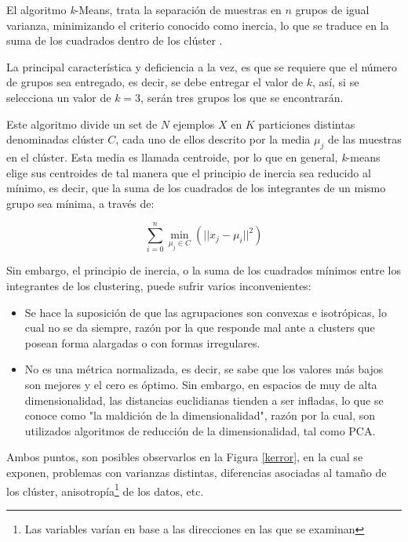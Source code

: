 El algoritmo \textit{k}-Means, trata la separación de muestras en $ n $ grupos de igual varianza, minimizando el criterio conocido como inercia, lo que se traduce en la suma de los cuadrados dentro de los clúster \cite{arthur2007k}.

La principal característica y deficiencia a la vez, es que se requiere que el número de grupos sea entregado, es decir, se debe entregar el valor de $k$, así, si se selecciona un valor de $k = 3$, serán tres grupos los que se encontrarán. 

Este algoritmo divide un set de $N$ ejemplos $X$ en $K$ particiones distintas denominadas clúster $C$, cada uno de ellos descrito por la media $\mu_{j}$ de las muestras en el clúster. Esta media es llamada centroide, por lo que en general, \textit{k}-means  elige sus centroides de tal manera que el principio de inercia sea reducido al mínimo, es decir, que la suma de los cuadrados de los integrantes de un mismo grupo sea mínima, a través de:

\begin{equation}
	\sum_{i=0}^{n} \min_{\mu_{j} \in C} (|| x_{j}-\mu_{i}||^{2})
\end{equation}

Sin embargo, el principio de inercia, o la suma de los cuadrados mínimos entre los integrantes de los clustering, puede sufrir varios inconvenientes:

\begin{itemize}
	\item Se hace la suposición de que las agrupaciones son convexas e isotrópicas, lo cual no se da siempre, razón por la que responde mal ante a clusters que posean forma alargadas o con formas irregulares.
	
	\item No es una métrica normalizada, es decir, se sabe que los valores más bajos son mejores y el cero es óptimo. Sin embargo, en espacios de muy de alta dimensionalidad, las distancias euclidianas tienden a ser infladas, lo que se conoce como  "la maldición de la dimensionalidad", razón por la cual, son utilizados algoritmos de reducción de la dimensionalidad, tal como PCA.
	
\end{itemize}

Ambos puntos, son posibles observarlos en la Figura  \ref{kerror}, en la cual se exponen, problemas con varianzas distintas, diferencias asociadas al tamaño de los clúster, anisotropía\footnote{Las variables varían en base a las direcciones en las que se examinan} de los datos, etc.

